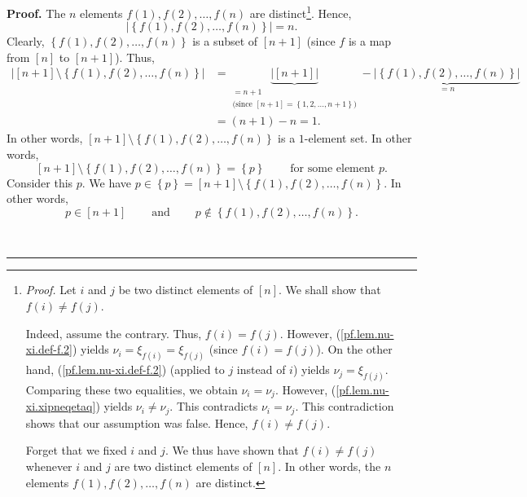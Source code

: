 \documentclass
[numbers=enddot,12pt,final,onecolumn,notitlepage,english]{scrartcl}%
\theoremstyle{definition}
\newenvironment{proof}[1][Proof]{\noindent\textbf{#1.} }{\ \rule{0.5em}{0.5em}}
\newenvironment{verlong}{}{}
\begin{document}
\begin{verlong}
\begin{proof}
The $n$ elements $f\left(  1\right)  ,f\left(  2\right)  ,\ldots,f\left(
n\right)  $ are distinct\footnote{\textit{Proof.} Let $i$ and $j$ be two
distinct elements of $\left[  n\right]  $. We shall show that $f\left(
i\right)  \neq f\left(  j\right)  $.
\par
Indeed, assume the contrary. Thus, $f\left(  i\right)  =f\left(  j\right)  $.
However, (\ref{pf.lem.nu-xi.def-f.2}) yields $\nu_{i}=\xi_{f\left(  i\right)
}=\xi_{f\left(  j\right)  }$ (since $f\left(  i\right)  =f\left(  j\right)
$). On the other hand, (\ref{pf.lem.nu-xi.def-f.2}) (applied to $j$ instead of
$i$) yields $\nu_{j}=\xi_{f\left(  j\right)  }$. Comparing these two
equalities, we obtain $\nu_{i}=\nu_{j}$. However,
(\ref{pf.lem.nu-xi.xipneqetaq}) yields $\nu_{i}\neq\nu_{j}$. This contradicts
$\nu_{i}=\nu_{j}$. This contradiction shows that our assumption was false.
Hence, $f\left(  i\right)  \neq f\left(  j\right)  $.
\par
Forget that we fixed $i$ and $j$. We thus have shown that $f\left(  i\right)
\neq f\left(  j\right)  $ whenever $i$ and $j$ are two distinct elements of
$\left[  n\right]  $. In other words, the $n$ elements $f\left(  1\right)
,f\left(  2\right)  ,\ldots,f\left(  n\right)  $ are distinct.}. Hence,
\[
\left\vert \left\{  f\left(  1\right)  ,f\left(  2\right)  ,\ldots,f\left(
n\right)  \right\}  \right\vert =n.
\]
Clearly, $\left\{  f\left(  1\right)  ,f\left(  2\right)  ,\ldots,f\left(
n\right)  \right\}  $ is a subset of $\left[  n+1\right]  $ (since $f$ is a
map from $\left[  n\right]  $ to $\left[  n+1\right]  $). Thus,%
\begin{align*}
\left\vert \left[  n+1\right]  \setminus\left\{  f\left(  1\right)  ,f\left(
2\right)  ,\ldots,f\left(  n\right)  \right\}  \right\vert  &
=\underbrace{\left\vert \left[  n+1\right]  \right\vert }%
_{\substack{=n+1\\\text{(since }\left[  n+1\right]  =\left\{  1,2,\ldots
,n+1\right\}  \text{)}}}-\underbrace{\left\vert \left\{  f\left(  1\right)
,f\left(  2\right)  ,\ldots,f\left(  n\right)  \right\}  \right\vert }_{=n}\\
&  =\left(  n+1\right)  -n=1.
\end{align*}
In other words, $\left[  n+1\right]  \setminus\left\{  f\left(  1\right)
,f\left(  2\right)  ,\ldots,f\left(  n\right)  \right\}  $ is a $1$-element
set. In other words,
\[
\left[  n+1\right]  \setminus\left\{  f\left(  1\right)  ,f\left(  2\right)
,\ldots,f\left(  n\right)  \right\}  =\left\{  p\right\}
\ \ \ \ \ \ \ \ \ \ \text{for some element }p.
\]
Consider this $p$. We have $p\in\left\{  p\right\}  =\left[  n+1\right]
\setminus\left\{  f\left(  1\right)  ,f\left(  2\right)  ,\ldots,f\left(
n\right)  \right\}  $. In other words,
\[
p\in\left[  n+1\right]  \ \ \ \ \ \ \ \ \ \ \text{and}%
\ \ \ \ \ \ \ \ \ \ p\notin\left\{  f\left(  1\right)  ,f\left(  2\right)
,\ldots,f\left(  n\right)  \right\}  .
\]



\end{proof}
\end{verlong}
\end{document}
